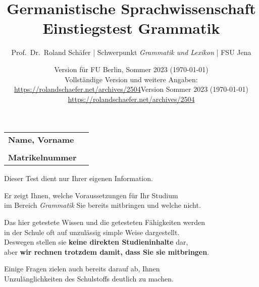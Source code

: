 \documentclass[12pt,a4paper,twoside]{article}
\author{Prof.\ Dr.\ Roland Schäfer | Schwerpunkt \textit{Grammatik und Lexikon} | FSU Jena}
\title{Germanistische Sprachwissenschaft\\Einstiegstest Grammatik}
\date{Version für FU Berlin, Sommer 2023 (\today)\\[\baselineskip]
  Vollständige Version und weitere Angaben:\\[0.25\baselineskip]
    \url{https://rolandschaefer.net/archives/2504}}
\date{Version Sommer 2023 (\today)\\[0.5\baselineskip]
    \url{https://rolandschaefer.net/archives/2504}}
\newcommand{\Zeile}{\vspace{\baselineskip}}
\begin{document}
\maketitle
\thispagestyle{empty}

\begin{tabular}[h]{lp{8cm}}
  \textbf{Name, Vorname} & \\\cline{2-2}
  &\\
  \textbf{Matrikelnummer} & \\\cline{2-2}
\end{tabular}

\vspace{2cm}

\begin{center}

  \begin{ignorable}

  \Zeile
  \end{ignorable}

  \Large{Dieser Test dient nur Ihrer eigenen Information.\\

    \Zeile

  Er zeigt Ihnen, welche Voraussetzungen für Ihr Studium\\
  im Bereich \textit{Grammatik} Sie bereits mitbringen und welche nicht.\\

  \Zeile

  Das hier getestete Wissen und die getesteten Fähigkeiten werden\\
  in der Schule oft auf unzulässig simple Weise dargestellt.\\
  Deswegen stellen sie \textbf{keine direkten Studieninhalte} dar,\\
  aber \textbf{wir rechnen trotzdem damit, dass Sie sie mitbringen}.\\
  
  \Zeile

  Einige Fragen zielen auch bereits darauf ab, Ihnen\\
  Unzulänglichkeiten des Schulstoffs deutlich zu machen.
}
\end{center}

\newpage
\setcounter{page}{1}
\fancyfoot[C]{\thepage}


\end{document}

